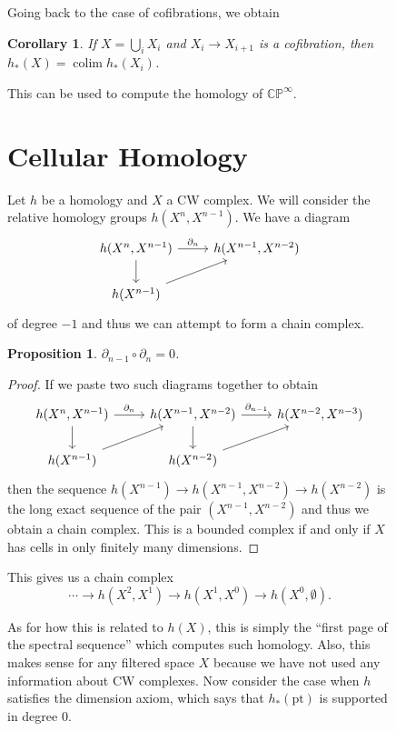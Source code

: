 \documentclass[leqno, openany]{memoir}
\newtheorem{cor}[thm]{Corollary}
\newtheorem{prop}[thm]{Proposition}
\theoremstyle{definition}
\theoremstyle{remark}
\theoremstyle{plain}
\theoremstyle{definition}
\theoremstyle{remark}
\newcommand{\C}{\mathbb{C}}
\renewcommand{\P}{\mathbb{P}}
\newcommand{\mr}[1]{\mathrm{#1}}
\DeclareMathOperator{\colim}{colim}
\begin{document}
\begin{figure}[H]
Going back to the case of cofibrations, we obtain \begin{cor} If $X = \bigcup_i
X_i$ and $X_i \to X_{i+1}$ is a cofibration, then $h_*(X) = \colim h_*(X_i)$.
\end{cor}

This can be used to compute the homology of $\C\P^{\infty}$.

\section{Cellular Homology}%

Let $h$ be a homology and $X$ a CW complex. We will consider the relative
homology groups $h(X^n, X^{n-1})$. We have a diagram \begin{equation*}
    \begin{tikzcd} h(X^n, X^{n-1}) \arrow{d} \arrow{r}{\partial_n} & h(X^{n-1},
        X^{n-2}) \\ h(X^{n-1}) \arrow{ur} \end{tikzcd} \end{equation*} of
        degree $-1$ and thus we can attempt to form a chain complex.

\begin{prop} $\partial_{n-1} \circ \partial_n = 0$.  \end{prop}

\begin{proof} If we paste two such diagrams together to obtain
    \begin{equation*} \begin{tikzcd} h(X^n, X^{n-1}) \arrow{r}{\partial_n}
        \arrow{d} & h(X^{n-1}, X^{n-2}) \arrow{r}{\partial_{n-1}} \arrow{d} &
        h(X^{n-2}, X^{n-3}) \\ h(X^{n-1}) \arrow{ur} & h(X^{n-2}) \arrow{ur}
    \end{tikzcd} \end{equation*} then the sequence $h(X^{n-1}) \to h(X^{n-1},
    X^{n-2}) \to h(X^{n-2})$ is the long exact sequence of the pair $(X^{n-1},
    X^{n-2})$ and thus we obtain a chain complex. This is a bounded complex if
    and only if $X$ has cells in only finitely many dimensions.  \end{proof}

This gives us a chain complex \[ \cdots \to h(X^2, X^1) \to h(X^1, X^0) \to
h(X^0, \emptyset). \]

As for how this is related to $h(X)$, this is simply the ``first page of the
spectral sequence'' which computes such homology. Also, this makes sense for
any filtered space $X$ because we have not used any information about CW
complexes. Now consider the case when $h$ satisfies the dimension axiom, which
says that $h_*(\mr{pt})$ is supported in degree $0$.


\end{figure}
\end{document}
